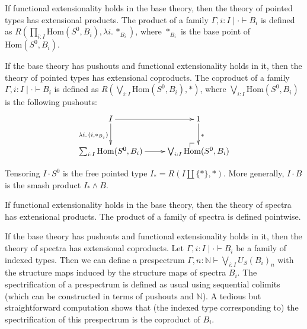 \documentclass[reqno]{mscs}
\makeatletter
\newcommand{\fs}[1]{\mathrm{#1}}
\newcommand{\Hom}{\fs{Hom}}
\numberwithin{figure}{section}
\newcommand{\po}[1][dr]{\save*!/#1+1.2pc/#1:(1,-1)@^{|-}\restore}
\makeatother
\begin{document}
\begin{example}
If functional extensionality holds in the base theory, then the theory of pointed types has extensional products.
The product of a family $\Gamma, i : I \mid \cdot \vdash B_i$ is defined as $R(\prod_{i : I} \Hom(S^0,B_i), \lambda i.\,*_{B_i})$, where $*_{B_i}$ is the base point of $\Hom(S^0,B_i)$.
\end{example}

\begin{example}
If the base theory has pushouts and functional extensionality holds in it, then the theory of pointed types has extensional coproducts.
The coproduct of a family $\Gamma, i : I \mid \cdot \vdash B_i$ is defined as $R(\bigvee_{i : I} \Hom(S^0, B_i), *)$, where $\bigvee_{i : I} \Hom(S^0, B_i)$ is the following pushouts:
\[ \xymatrix{ I                           \ar[r] \ar[d]_{\lambda i.\,(i,*_{B_i})} & 1 \ar[d]^{*} \\
              \sum_{i : I} \Hom(S^0, B_i) \ar[r]                                  & \po \bigvee_{i : I} \Hom(S^0, B_i)
            } \]
\end{example}

\begin{example}
Tensoring $I \cdot S^0$ is the free pointed type $I_* = R(I \amalg \{ * \}, *)$.
More generally, $I \cdot B$ is the smash product $I_* \wedge B$.
\end{example}

\begin{example}
If functional extensionality holds in the base theory, then the theory of spectra has extensional products.
The product of a family of spectra is defined pointwise.
\end{example}

\begin{example}
If the base theory has pushouts and functional extensionality holds in it, then the theory of spectra has extensional coproducts.
Let $\Gamma, i : I \mid \cdot \vdash B_i$ be a family of indexed types.
Then we can define a prespectrum $\Gamma, n : \mathbb{N} \vdash \bigvee_{i : I} U_S(B_i)_n$ with the structure maps induced by the structure maps of spectra $B_i$.
The spectrification of a prespectrum is defined as usual using sequential colimits (which can be constructed in terms of pushouts and $\mathbb{N}$).
A tedious but straightforward computation shows that (the indexed type corresponding to) the spectrification of this prespectrum is the coproduct of $B_i$.
\end{example}
\end{document}
